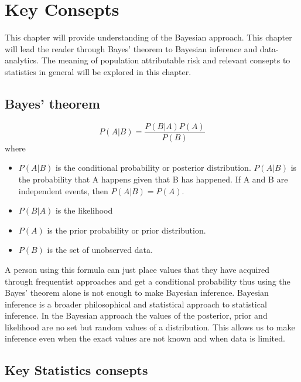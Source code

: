 \chapter{Key Consepts} \label{sec:Consepts}

This chapter will provide understanding of the Bayesian approach. This chapter will lead the reader through Bayes' theorem to Bayesian inference and data-analytics. The meaning of population attributable risk and relevant consepts to statistics in general will be explored in this chapter.  

\section{Bayes' theorem}\label{BayesianTheorem}
\begin{equation}
P(A|B) = \frac{P(B|A)P(A)}{P(B)}
\end{equation}
where
\begin{itemize}
    \item $P(A|B)$ is the conditional probability \cite{Gut2005ProbabilityAG} or posterior distribution.\cite{Mcelreath2015StatisticalRA} $P(A|B)$ is the probability that A happens given that B has happened. If A and B are independent events, then $P(A|B) = P(A)$. \cite{Gut2005ProbabilityAG}
    \item $P(B|A)$ is the likelihood\cite{Gut2005ProbabilityAG}\cite{Mcelreath2015StatisticalRA}
    \item $P(A)$ is the prior probability \cite{Gut2005ProbabilityAG} or prior distribution.\cite{Mcelreath2015StatisticalRA}
    \item $P(B)$ is the set of unobserved data. 
\end{itemize}

A person using this formula can just place values that they have acquired through frequentist approaches and get a conditional probability thus using the Bayes' theorem alone is not enough to make Bayesian inference. Bayesian inference is a broader philosophical and statistical approach to statistical inference.\cite{Mcelreath2015StatisticalRA} In the Bayesian approach the values of the posterior, prior and likelihood are no set but random values of a distribution.\cite{Gut2005ProbabilityAG} This allows us to make inference even when the exact values are not known and when data is limited.

\section{Key Statistics consepts}\label{RelevantConseptsOfStatistics}
